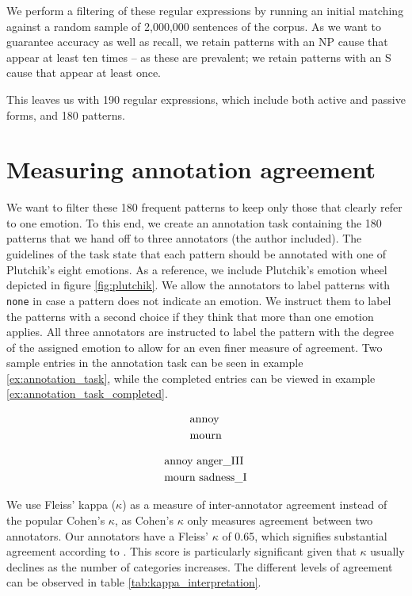 We perform a filtering of these regular expressions by running an initial matching against a random sample of 2,000,000 sentences of the corpus. As we want to guarantee accuracy as well as recall, we retain patterns with an NP cause that appear at least ten times -- as these are prevalent; we retain patterns with an S cause that appear at least once.

This leaves us with 190 regular expressions, which include both active and passive forms, and 180 patterns. 

\section{Measuring annotation agreement} \label{sec:agreement}

We want to filter these 180 frequent patterns to keep only those that clearly refer to one emotion. To this end, we create an annotation task containing the 180 patterns that we hand off to three annotators (the author included). The guidelines of the task state that each pattern should be annotated with one of Plutchik's eight emotions. As a reference, we include Plutchik's emotion wheel depicted in figure \ref{fig:plutchik}. We allow the annotators to label patterns with \texttt{none} in case a pattern does not indicate an emotion. We instruct them to label the patterns with a second choice if they think that more than one emotion applies. All three annotators are instructed to label the pattern with the degree of the assigned emotion to allow for an even finer measure of agreement. Two sample entries in the annotation task can be seen in example \ref{ex:annotation_task}, while the completed entries can be viewed in example \ref{ex:annotation_task_completed}.

\begin{align}
\begin{split}\label{ex:annotation_task}
&\textnormal{annoy}\\
&\textnormal{mourn}
\end{split}
\end{align}

\begin{align}
\begin{split}\label{ex:annotation_task_completed}
&\textnormal{annoy	anger\_III}\\
&\textnormal{mourn	sadness\_I}
\end{split}
\end{align}

We use Fleiss' kappa ($\kappa$) as a measure of inter-annotator agreement instead of the popular Cohen's $\kappa$, as Cohen's $\kappa$ only measures agreement between two annotators. Our annotators have a Fleiss' $\kappa$ of 0.65, which signifies substantial agreement according to \citeauthor{kappa}. This score is particularly significant given that $\kappa$ usually declines as the number of categories increases. The different levels of agreement can be observed in table \ref{tab:kappa_interpretation}.

